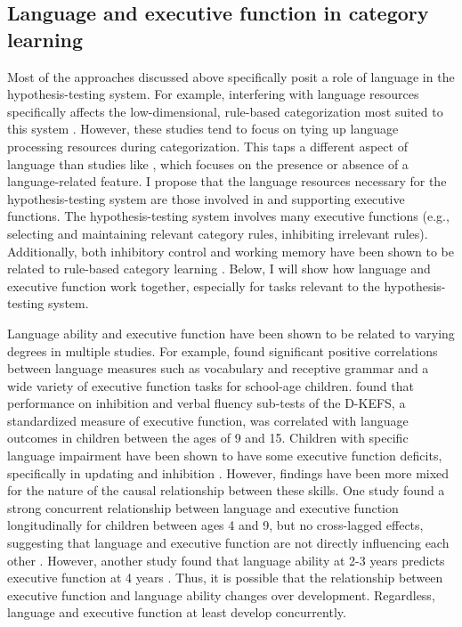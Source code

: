 \documentclass[../dissertation.tex]{subfiles}
\begin{document}
\subsection{Language and executive function in category learning}
Most of the approaches discussed above specifically posit a role of language in the hypothesis-testing system. For example, interfering with language resources specifically affects the low-dimensional, rule-based categorization most suited to this system \citep{Lupyan2009,Minda2008}. However, these studies tend to focus on tying up language processing resources during categorization. This taps a different aspect of language than studies like \citet{Lupyan2007}, which focuses on the presence or absence of a language-related feature. I propose that the language resources necessary for the hypothesis-testing system are those involved in and supporting executive functions. The hypothesis-testing system involves many executive functions (e.g., selecting and maintaining relevant category rules, inhibiting irrelevant rules). Additionally, both inhibitory control and working memory have been shown to be related to rule-based category learning \citep{Rabi2014}. Below, I will show how language and executive function work together, especially for tasks relevant to the hypothesis-testing system. \par
	Language ability and executive function have been shown to be related to varying degrees in multiple studies. For example, \citet{Figueras2008} found significant positive correlations between language measures such as vocabulary and receptive grammar and a wide variety of executive function tasks for school-age children. \citet{Berninger2017} found that performance on inhibition and verbal fluency sub-tests of the D-KEFS, a standardized measure of executive function, was correlated with language outcomes in children between the ages of 9 and 15. Children with specific language impairment have been shown to have some executive function deficits, specifically in updating and inhibition \citep{Im-Bolter2006}. However, findings have been more mixed for the nature of the causal relationship between these skills. One study found a strong concurrent relationship between language and executive function longitudinally for children between ages 4 and 9, but no cross-lagged effects, suggesting that language and executive function are not directly influencing each other \citep{Gooch2016}. However, another study found that language ability at 2-3 years predicts executive function at 4 years \citep{Kuhn2014}. Thus, it is possible that the relationship between executive function and language ability changes over development. Regardless, language and executive function at least develop concurrently. \par
\end{document}
